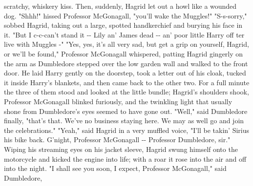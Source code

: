 \documentclass{article}%
\begin{document}
\newline%
scratchy, whiskery kiss. Then, suddenly, Hagrid let out a howl like a
\newline%
wounded dog.
\newline%
"Shhh!" hissed Professor McGonagall, "you'll wake the Muggles!"
\newline%
"S{-}s{-}sorry," sobbed Hagrid, taking out a large, spotted handkerchief and
\newline%
burying his face in it. "But I c{-}c{-}can't stand it {-}{-} Lily an' James dead
\newline%
{-}{-} an' poor little Harry off ter live with Muggles {-}"
\newline%
"Yes, yes, it's all very sad, but get a grip on yourself, Hagrid, or
\newline%
we'll be found," Professor McGonagall whispered, patting Hagrid gingerly
\newline%
on the arm as Dumbledore stepped over the low garden wall and walked to
\newline%
the front door. He laid Harry gently on the doorstep, took a letter out
\newline%
of his cloak, tucked it inside Harry's blankets, and then came back to
\newline%
the other two. For a full minute the three of them stood and looked at
\newline%
the little bundle; Hagrid's shoulders shook, Professor McGonagall
\newline%
blinked furiously, and the twinkling light that usually shone from
\newline%
Dumbledore's eyes seemed to have gone out.
\newline%
"Well," said Dumbledore finally, "that's that. We've no business staying
\newline%
here. We may as well go and join the celebrations."
\newline%
"Yeah," said Hagrid in a very muffled voice, "I'll be takin' Sirius his
\newline%
bike back. G'night, Professor McGonagall {-}{-} Professor Dumbledore, sir."
\newline%
Wiping his streaming eyes on his jacket sleeve, Hagrid swung himself
\newline%
onto the motorcycle and kicked the engine into life; with a roar it rose
\newline%
into the air and off into the night.
\newline%
"I shall see you soon, I expect, Professor McGonagall," said Dumbledore,
\end{document}
